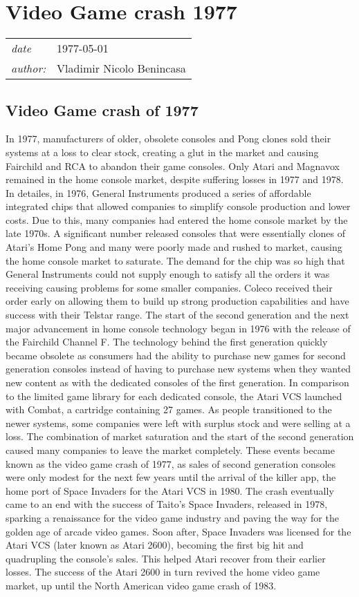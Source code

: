 \documentclass[a4paper,10pt]{book}
\newcommand{\pageHeader}[4]{
    \section{#1}
    \vspace{-0.3cm}
    \begin{table}[h!]
     \begin{tabular}{ll}
        \hline
        \textit{date} & #2 \\
        \textit{author: } & #3\\
        \hline
     \end{tabular}
    \end{table}
    \vspace{-0.3cm}
}
\begin{document}
 
 \newpage\pageHeader{Video Game crash 1977 }{1977-05-01}{Vladimir Nicolo Benincasa}{Video Game crash of 1977 (end of the first generation)}
 \subsection{Video Game crash of 1977 }
 
          In 1977, manufacturers of older, obsolete consoles and Pong clones sold their systems at a loss to clear stock, creating a glut in the market and causing Fairchild and RCA to abandon their game consoles. Only Atari and Magnavox remained in the home console market, despite suffering losses in 1977 and 1978.
          In detailes, in 1976, General Instruments produced a series of affordable integrated chips that allowed companies to simplify console production and lower costs. Due to this, many companies had entered the home console market by the late 1970s. A significant number released consoles that were essentially clones of Atari's Home Pong and many were poorly made and rushed to market, causing the home console market to saturate.
          The demand for the chip was so high that General Instruments could not supply enough to satisfy all the orders it was receiving causing problems for some smaller companies. Coleco received their order early on allowing them to build up strong production capabilities and have success with their Telstar range.
          The start of the second generation and the next major advancement in home console technology began in 1976 with the release of the Fairchild Channel F. The technology behind the first generation quickly became obsolete as consumers had the ability to purchase new games for second generation consoles instead of having to purchase new systems when they wanted new content as with the dedicated consoles of the first generation. In comparison to the limited game library for each dedicated console, the Atari VCS launched with Combat, a cartridge containing 27 games. As people transitioned to the newer systems, some companies were left with surplus stock and were selling at a loss. The combination of market saturation and the start of the second generation caused many companies to leave the market completely. These events became known as the video game crash of 1977, as sales of second generation consoles were only modest for the next few years until the arrival of the killer app, the home port of Space Invaders for the Atari VCS in 1980.
           The crash eventually came to an end with the success of Taito's Space Invaders, released in 1978, sparking a renaissance for the video game industry and paving the way for the golden age of arcade video games. Soon after, Space Invaders was licensed for the Atari VCS (later known as Atari 2600), becoming the first big hit and quadrupling the console's sales. This helped Atari recover from their earlier losses. The success of the Atari 2600 in turn revived the home video game market, up until the North American video game crash of 1983.
       
\end{document}
